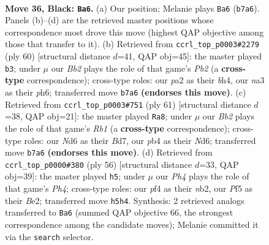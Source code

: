 \documentclass[11pt]{article}
\begin{document}
\clearpage

\begin{figure}[p]\centering
\begin{subfigure}{0.46\textwidth}\centering
\resizebox{\linewidth}{!}{%
\newchessgame
\chessboard[
  setfen={r7/pbpp4/1p1n2k1/5p1p/BPP2P2/N7/P2PK2P/R7 b - - 2 36},
  showmover=false,
  pgfstyle=straightmove, color=movearrow, markmove={b7-a6}
]}
\caption{}
\end{subfigure}\hfill
\begin{subfigure}{0.46\textwidth}\centering
\resizebox{\linewidth}{!}{%
\newchessgame
\chessboard[
  setfen={r5k1/pp6/3pN1pp/2pPn3/2P1B2b/7P/PP4PK/5R2 w - c6 0 31},
  showmover=false,
  pgfstyle=straightmove, color=movearrow, markmove={b2-b3}
]}
\caption{}
\end{subfigure}
\\[4pt]
\begin{subfigure}{0.46\textwidth}\centering
\resizebox{\linewidth}{!}{%
\newchessgame
\chessboard[
  setfen={1r1k4/2pb1pp1/1p1n3p/3P4/p4KPP/3BN3/PP3P2/2R5 b - - 0 31},
  showmover=false,
  pgfstyle=straightmove, color=movearrow, markmove={b8-a8}
]}
\caption{}
\end{subfigure}\hfill
\begin{subfigure}{0.46\textwidth}\centering
\resizebox{\linewidth}{!}{%
\newchessgame
\chessboard[
  setfen={2r5/1p3pk1/5p2/p3p3/6NP/Pb2PP1R/1n2B1P1/4K3 w - - 0 29},
  showmover=false,
  pgfstyle=straightmove, color=movearrow, markmove={h4-h5}
]}
\caption{}
\end{subfigure}
\caption{\textbf{Move 36, Black: \texttt{Ba6}.} (a) Our position; Melanie plays \texttt{Ba6} (\texttt{b7a6}). Panels (b)--(d) are the retrieved master positions whose correspondence most drove this move (highest QAP objective among those that transfer to it). (b) Retrieved from \texttt{ccrl\_top\_p0003\#2279} (ply 60) [structural distance $d$=41, QAP obj=45]: the master played \texttt{b3}; under $\mu$ our \emph{Bb2} plays the role of that game's \emph{Pb2} (a \textbf{cross-type} correspondence); cross-type roles: our \emph{p}a2 as their \emph{b}h4, our \emph{n}a3 as their \emph{p}h6; transferred move \texttt{b7a6} \textbf{(endorses this move)}. (c) Retrieved from \texttt{ccrl\_top\_p0003\#751} (ply 61) [structural distance $d$=38, QAP obj=21]: the master played \texttt{Ra8}; under $\mu$ our \emph{Bb2} plays the role of that game's \emph{Rb1} (a \textbf{cross-type} correspondence); cross-type roles: our \emph{N}d6 as their \emph{B}d7, our \emph{p}b4 as their \emph{N}d6; transferred move \texttt{b7a6} \textbf{(endorses this move)}. (d) Retrieved from \texttt{ccrl\_top\_p0000\#380} (ply 56) [structural distance $d$=33, QAP obj=39]: the master played \texttt{h5}; under $\mu$ our \emph{Ph4} plays the role of that game's \emph{Ph4}; cross-type roles: our \emph{p}f4 as their \emph{n}b2, our \emph{P}f5 as their \emph{B}e2; transferred move \texttt{h5h4}. Synthesis: 2 retrieved analogs transferred to \texttt{Ba6} (summed QAP objective 66, the strongest correspondence among the candidate moves); Melanie committed it via the \texttt{search} selector.}
\label{fig:thought-m71}
\end{figure}
\end{document}
